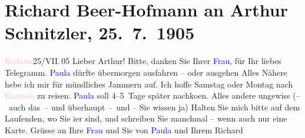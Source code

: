 

               \section[Richard Beer-Hofmann an Arthur Schnitzler, 25. 7. 1905]{ Richard Beer-Hofmann an Arthur Schnitzler, 25. 7. 1905}\nopagebreak{}\rehead{ }\normalsize\beginnumbering{} \toendnotes[C]{\smallbreak\pagebreak[2]} 
\toendnotes[C]{\smallbreak}\pstart
           \raggedleft{}{\pb}\textcolor{pink}{Rodaun}{}\ledrightnote{\textcolor{pink}{Rodaun}}{ }25/VII. 05\pend
           \pstart
           Lieber Arthur! Bitte, danken Sie Ihrer \textcolor{blue}{Frau}{}, für Ihr liebes Telegramm. \textcolor{blue}{Paula}{}\ledrightnote{\textcolor{blue}{Paula Beer-Hofmann}} dürfte übermorgen ausfahren – oder ausgehen
               Alles Nähere hebe ich mir für mündliches Jammern auf. Ich hoffe Samstag
               oder Montag nach \textcolor{pink}{Kärnten}{}\ledrightnote{\textcolor{pink}{Kärnten}} zu reisen. \textcolor{blue}{Paula}{}\ledrightnote{\textcolor{blue}{Paula Beer-Hofmann}} soll 4–5 Tage später nachko{\geminationm}en. Alles andere ungewiss (– auch das – und überhaupt
               – und – Sie wissen ja)\pend
           \pstart
           {\pb}Halten Sie mich bitte auf dem
               Laufenden, wo Sie i{\geminationm}er sind, und schreiben Sie manchmal
               – wenn auch nur eine Karte. Grüsse an Ihre \textcolor{blue}{Frau}{} und Sie von \textcolor{blue}{Paula}{}\ledrightnote{\textcolor{blue}{Paula Beer-Hofmann}}
               und Ihrem\pend
           \pstart \spacefill\mbox{Richard}\pend{}\endnumbering{}  
      